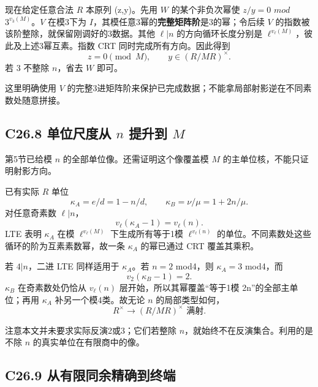 \documentclass[11pt,a4paper]{article}
\theoremstyle{definition}
\numberwithin{equation}{section}
\begin{document}
{现在给定任意合法} {\ensuremath{R}} {本原列} {(z,y)。先用} {\ensuremath{W}} {的某个非负次幂使} {\ensuremath{z/y=0}} {\ensuremath{mod}} {\ensuremath{3^{v_{3}(M)}}。\ensuremath{V}} {在模3下为} {\ensuremath{I}，其模任意3幂的}\textbf{{完整矩阵阶}}{是3的幂；令后续} {\ensuremath{V}} {的指数被该阶整除，就保留刚调好的3数据。其他} {\ensuremath{\ell |n}} {的方向循环长度分别是} {\ensuremath{\ell ^{v_\ell (M)}}，彼此及上述3幂互素。指数} {CRT} {同时完成所有方向。因此得到} \[
z=0\pmod M,\qquad y\in(R/MR)^\times.
\tag{C26.7.4}
\] {若} {3} {不整除} {\ensuremath{n}，省去} {\ensuremath{W}} {即可。}

{这里明确使用} {\ensuremath{V}} {的完整3进矩阵阶来保护已完成数据；不能拿局部射影逆在不同素数处随意拼接。}

\subsection*{\texorpdfstring{{C26.8} {单位尺度从} {\ensuremath{n}} {提升到} {\ensuremath{M}}}{C26.8 单位尺度从  提升到 }}\label{C26-h166}

{第5节已给模} {\ensuremath{n}} {的全部单位像。还需证明这个像覆盖模} {\ensuremath{M}} {的主单位核，不能只证明射影方向。}

{已有实际} {\ensuremath{R}} {单位} \[
\kappa_A=e/d=1-n/d,\qquad
\kappa_B=\nu/\mu=1+2n/\mu.
\tag{C26.8.1}
\] {对任意奇素数} {\ensuremath{\ell |n}，} \[
v_\ell(\kappa_A-1)=v_\ell(n).
\] {LTE} {表明} {\ensuremath{\kappa _{A}}} {在模} {\ensuremath{\ell ^{v_\ell (M)}}} {下生成所有等于1模} {\ensuremath{\ell ^{v_\ell (n)}}} {的单位。不同素数处这些循环的阶为互素素数幂，故一条} {\ensuremath{\kappa _{A}}} {的幂已通过} {CRT} {覆盖其乘积。}

{若} {\ensuremath{4|n}，二进} {LTE} {同样适用于} {\ensuremath{\kappa _{A}}。若} {\ensuremath{n=2}} {mod4，则} {\ensuremath{\kappa _{A}=3}} {mod4，而} \[
v_2(\kappa_B-1)=2.
\] {\ensuremath{\kappa _{B}}} {在奇素数处仍恰从} {\ensuremath{v_\ell (n)}} {层开始，所以其幂覆盖``等于1模} {2n''的全部主单位；再用} {\ensuremath{\kappa _{A}}} {补另一个模4类。故无论} {\ensuremath{n}} {的局部类型如何，} \[
\boxed{R^\times\longrightarrow(R/MR)^\times
\text{ 满射}.}
\tag{C26.8.2}
\]

{注意本文并未要求实际反演2或3；它们若整除} {\ensuremath{n}，就始终不在反演集合。利用的是不除} {\ensuremath{n}} {的真实单位在有限商中的像。}

\subsection*{\texorpdfstring{{C26.9} {从有限同余精确到终端}}{C26.9 从有限同余精确到终端}}\label{C26-h167}
\end{document}
